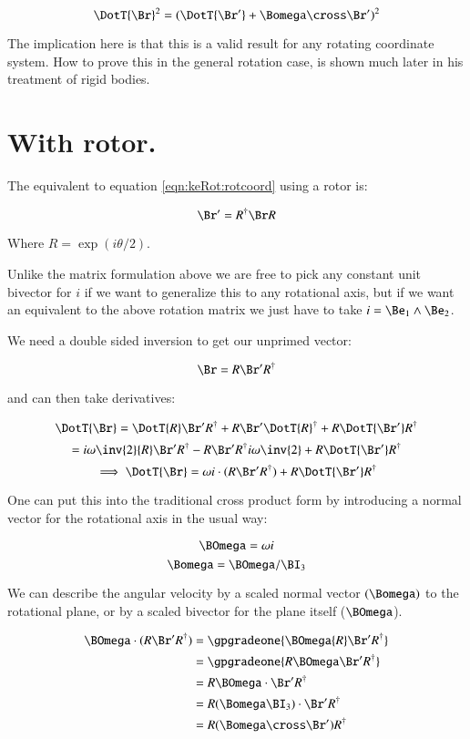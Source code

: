 \[
\DotT{\Br}^2 = ( \DotT{\Br'} + \Bomega \cross \Br')^2
\]

The implication here is that this is a valid result for any rotating
coordinate system.   How to prove this in the general rotation case, is shown much later
in his treatment of rigid bodies.

\section{With rotor. }

The equivalent to equation \ref{eqn:keRot:rotcoord} using a rotor is:

\begin{equation}
\Br' = R^\dagger \Br R
\end{equation}

Where $R = \exp( i\theta/2 )$.

Unlike the 
matrix formulation above we are free to pick any constant unit bivector
for $i$ if we want to generalize this to any rotational axis, but if we
want an equivalent to the above rotation matrix we just have to take
$i = \Be_1 \wedge \Be_2$.

We need a double sided inversion to get our unprimed vector:

\[
\Br = R \Br' R^\dagger
\]

and can then take derivatives:

\[
\DotT{\Br} = 
\DotT{R} \Br' R^\dagger
+{R} {\Br'} \DotT{R}^\dagger
+{R} \DotT{\Br'} R^\dagger
\]
\[
= 
i\omega \inv{2} {R} \Br' R^\dagger
- {R} \Br' R^\dagger i\omega\inv{2}
+{R} \DotT{\Br'} R^\dagger
\]
\begin{equation}\label{eqn:keRot:velocityfixedrotplane}
\implies
\DotT{\Br} = \omega i \cdot ({R} \Br' R^\dagger) +  {R} \DotT{\Br'} R^\dagger
\end{equation}

One can put this into the traditional cross product form by introducing
a normal vector for the rotational axis in the usual way:

\[
\BOmega = \omega i
\]
\[
\Bomega = \BOmega / \BI_3
\]

We can describe the angular velocity by a scaled normal vector $(\Bomega)$ to the rotational plane, or by a scaled bivector for the plane itself ($\BOmega$).

\begin{align*}
\BOmega \cdot ({R} \Br' R^\dagger)
&= \gpgradeone{ \BOmega {R} \Br' R^\dagger } \\
&= \gpgradeone{ {R} \BOmega \Br' R^\dagger } \\
&= {R} \BOmega \cdot \Br' R^\dagger \\
&= {R} (\Bomega \BI_3) \cdot \Br' R^\dagger \\
&= {R} (\Bomega \cross \Br') R^\dagger \\
\end{align*}

